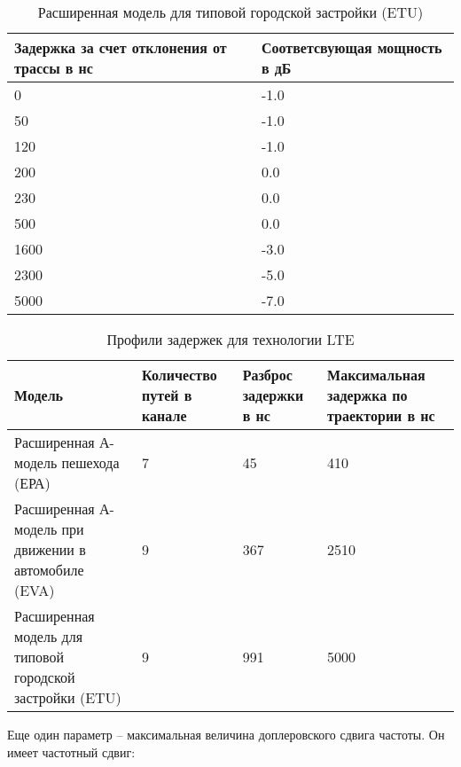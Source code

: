 \begin{table} [htb]
  \centering
\parbox{15cm}{\caption{Расширенная модель для типовой городской застройки (ETU) \cite{TS36104}}\label{ETU}}
\begin{tabular}{|p{7cm}|p{7cm}|}
    \hline
    \hline
    Задержка за счет отклонения от трассы в нс &  Соответсвующая мощность в дБ \\ \hline \hline
    0    & -1.0 \\ \hline
    50   & -1.0 \\ \hline
    120  & -1.0 \\ \hline
    200  & 0.0  \\ \hline
    230  & 0.0  \\ \hline
    500  & 0.0  \\ \hline
    1600 & -3.0 \\ \hline
    2300 & -5.0 \\ \hline
    5000 & -7.0 \\ \hline
    \end{tabular}
\end{table}



\begin{table} [htb]
  \centering
\parbox{15cm}{\caption{Профили задержек для технологии LTE \cite{iks}}\label{ProfileDelay}}
    \begin{tabular}{|p{4cm}|p{3cm}|p{3cm}|p{4cm}|}
    \hline \hline
    Модель                                                            &  Количество путей в канале &  Разброс задержки в нс &  Максимальная задержка по траектории в нс \\ \hline \hline
    Расширенная А-модель пешехода (ЕРА)                               & 7                          & 45                     & 410                                       \\ \hline
    Расширенная А-модель при движении в автомобиле (EVA) & 9                          & 367                    & 2510                                      \\ \hline
    Расширенная модель для типовой городской застройки (ETU)          & 9                          & 991                    & 5000                                      \\ \hline
    \end{tabular}
\end{table}



Еще один параметр – максимальная величина доплеровского сдвига частоты. Он имеет частотный сдвиг:

